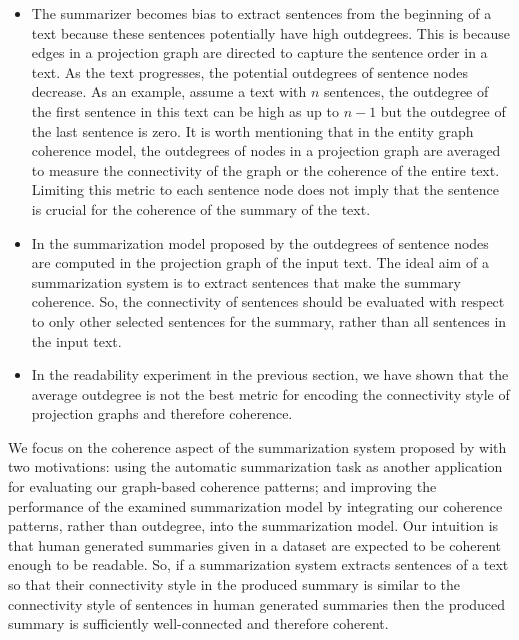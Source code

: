\begin{itemize}
	\item 
	The summarizer becomes bias to extract sentences from the beginning of a text because these sentences potentially have high outdegrees. 
	This is because edges in a projection graph are directed to capture the sentence order in a text.
	As the text progresses, the potential outdegrees of sentence nodes decrease. 
	As an example, assume a text with $n$ sentences, the outdegree of the first sentence in this text can be high as up to $n-1$ but the outdegree of the last sentence is zero. 
	It is worth mentioning that in the entity graph coherence model, the outdegrees of nodes in a projection graph are averaged to measure the connectivity of the graph or the coherence of the entire text.  
	Limiting this metric to each sentence node does not imply that the sentence is crucial for the coherence of the summary of the text.   
	
	\item 
	In the summarization model proposed by   the outdegrees of sentence nodes are computed in the projection graph of the input text.   
	The ideal aim of a summarization system is to extract sentences that make the summary coherence. 
	So, the connectivity of sentences should be evaluated with respect to only other selected sentences for the summary, rather than all sentences in the input text. 


	\item In the readability experiment in the previous section, we have shown that the average outdegree is not the best metric for encoding the connectivity style of projection graphs and therefore coherence. 
	
\end{itemize} 

We focus on the coherence aspect of the summarization system proposed by  with two motivations: using the automatic summarization task as another application for evaluating our graph-based coherence patterns; and improving the performance of the examined summarization model by integrating our coherence patterns, rather than outdegree, into the summarization model. 
Our intuition is that human generated summaries given in a dataset are expected to be coherent enough to be readable.
So, if a summarization system extracts sentences of a text so that their connectivity style in the produced summary is similar to the connectivity style of sentences in human generated summaries then the produced summary is sufficiently well-connected and therefore coherent. 
 
